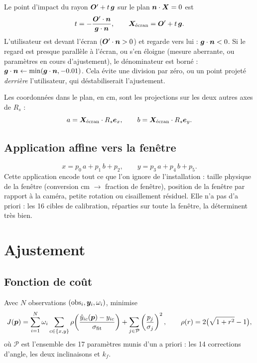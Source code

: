 Le point d'impact du rayon $\bm{O}' + t\,\bm{g}$ sur le plan $\bm{n}\cdot\bm{X} = 0$ est
\begin{equation}
  t = -\frac{\bm{O}'\cdot\bm{n}}{\bm{g}\cdot\bm{n}}, \qquad \bm{X}_\text{écran} = \bm{O}' + t\,\bm{g}.
\end{equation}
L'utilisateur est devant l'écran ($\bm{O}'\cdot\bm{n} > 0$) et regarde vers lui : $\bm{g}\cdot\bm{n} < 0$. Si le regard est presque parallèle à l'écran, ou s'en éloigne (mesure aberrante, ou paramètres en cours d'ajustement), le dénominateur est borné : $\bm{g}\cdot\bm{n} \leftarrow \min(\bm{g}\cdot\bm{n}, \num{-0.01})$. Cela évite une division par zéro, ou un point projeté \emph{derrière} l'utilisateur, qui déstabiliserait l'ajustement.

Les coordonnées dans le plan, en cm, sont les projections sur les deux autres axes de $R_s$ :
\begin{equation}
  a = \bm{X}_\text{écran}\cdot R_s\bm{e}_x, \qquad b = \bm{X}_\text{écran}\cdot R_s\bm{e}_y .
\end{equation}

\subsection{Application affine vers la fenêtre}

\begin{equation}
  x = p_0\,a + p_1\,b + p_2, \qquad y = p_3\,a + p_4\,b + p_5 .
\end{equation}
Cette application encode tout ce que l'on ignore de l'installation : taille physique de la fenêtre (conversion cm $\to$ fraction de fenêtre), position de la fenêtre par rapport à la caméra, petite rotation ou cisaillement résiduel. Elle n'a pas d'a priori : les 16 cibles de calibration, réparties sur toute la fenêtre, la déterminent très bien.

\section{Ajustement}

\subsection{Fonction de coût}

Avec $N$ observations $(\text{obs}_i, \bm{y}_i, \omega_i)$,  minimise
\begin{equation}
  J(\bm{p}) = \sum_{i=1}^{N} \omega_i \sum_{c\in\{x,y\}} \rho\!\left(\frac{\hat y_{ic}(\bm{p}) - y_{ic}}{\sigma_\text{fit}}\right)
   + \sum_{j \in \mathcal{P}} \left(\frac{p_j}{\sigma_j}\right)^2,
  \qquad \rho(r) = 2\big(\sqrt{1 + r^2} - 1\big),
\end{equation}
où $\mathcal{P}$ est l'ensemble des 17 paramètres munis d'un a priori : les 14 corrections d'angle, les deux inclinaisons et $k_f$.

